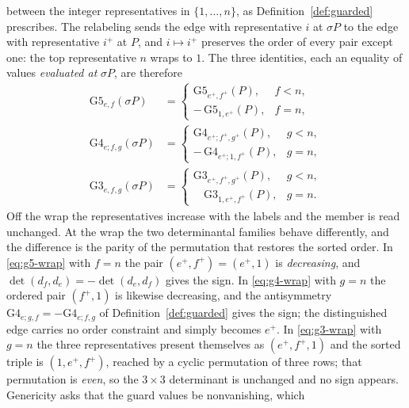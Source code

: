 \begin{axiom}
\begin{itemize}
  between the integer representatives in $\{1,\dots,n\}$, as
  Definition~\ref{def:guarded} prescribes. The relabeling sends the edge with
  representative $i$ at $\sigma P$ to the edge with representative $i^{+}$ at
  $P$, and $i\mapsto i^{+}$ preserves the order of every pair except one: the
  top representative $n$ wraps to $1$. The three identities, each an equality of
  values \emph{evaluated at} $\sigma P$, are therefore
  \begin{align}
    \mathrm{G5}_{e,f}(\sigma P)&=
      \begin{cases}
        \mathrm{G5}_{e^{+},f^{+}}(P), & f<n,\\[2pt]
        -\,\mathrm{G5}_{1,e^{+}}(P), & f=n,
      \end{cases}
    \label{eq:g5-wrap}\\[4pt]
    \mathrm{G4}_{e;f,g}(\sigma P)&=
      \begin{cases}
        \mathrm{G4}_{e^{+};f^{+},g^{+}}(P), & g<n,\\[2pt]
        -\,\mathrm{G4}_{e^{+};1,f^{+}}(P), & g=n,
      \end{cases}
    \label{eq:g4-wrap}\\[4pt]
    \mathrm{G3}_{e,f,g}(\sigma P)&=
      \begin{cases}
        \mathrm{G3}_{e^{+},f^{+},g^{+}}(P), & g<n,\\[2pt]
        \phantom{-\,}\mathrm{G3}_{1,e^{+},f^{+}}(P), & g=n.
      \end{cases}
    \label{eq:g3-wrap}
  \end{align}
  Off the wrap the representatives increase with the labels and the member is
  read unchanged. At the wrap the two determinantal families behave differently,
  and the difference is the parity of the permutation that restores the sorted
  order. In \eqref{eq:g5-wrap} with $f=n$ the pair $(e^{+},f^{+})=(e^{+},1)$ is
  \emph{decreasing}, and $\det(d_f,d_e)=-\det(d_e,d_f)$ gives the sign. In
  \eqref{eq:g4-wrap} with $g=n$ the ordered pair $(f^{+},1)$ is likewise
  decreasing, and the antisymmetry
  $\mathrm{G4}_{e;g,f}=-\mathrm{G4}_{e;f,g}$ of Definition~\ref{def:guarded}
  gives the sign; the distinguished edge carries no order constraint and simply
  becomes $e^{+}$. In \eqref{eq:g3-wrap} with $g=n$ the three representatives
  present themselves as $(e^{+},f^{+},1)$ and the sorted triple is
  $(1,e^{+},f^{+})$, reached by a cyclic permutation of three rows; that
  permutation is \emph{even}, so the $3\times3$ determinant is unchanged and no
  sign appears. Genericity asks that the guard values be nonvanishing, which

\end{itemize}
\end{axiom}
